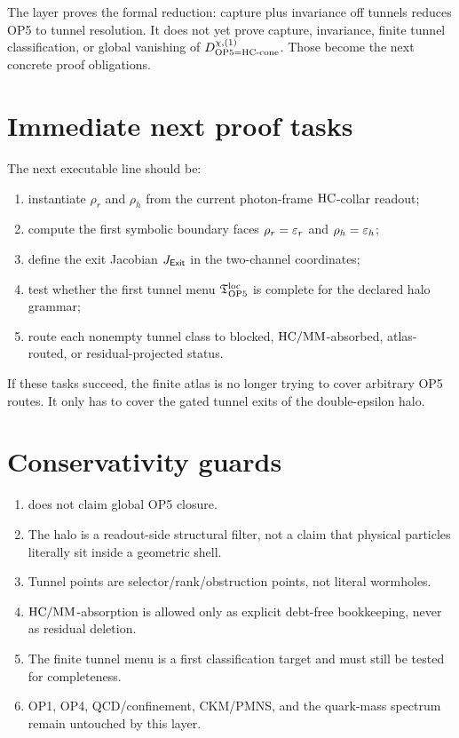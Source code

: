 \begin{remark}
The layer proves the formal reduction: capture plus invariance off tunnels reduces OP5 to tunnel resolution. It does not yet prove capture, invariance, finite tunnel classification, or global vanishing of \(D_{\mathrm{OP}5=\mathrm{HC}\text{-}\mathrm{cone}}^{\chi,(1)}\). Those become the next concrete proof obligations.
\end{remark}

\section{Immediate next proof tasks}

The next executable line should be:
\begin{enumerate}
 \item instantiate \(\rho_r\) and \(\rho_h\) from the current photon-frame \(\mathrm{HC}\)-collar readout;
 \item compute the first symbolic boundary faces \(\rho_r=\varepsilon_r\) and \(\rho_h=\varepsilon_h\);
 \item define the exit Jacobian \(J_{\mathsf{Exit}}\) in the two-channel coordinates;
 \item test whether the first tunnel menu \(\mathfrak T_{\mathrm{OP}5}^{\mathrm{loc}}\) is complete for the declared halo grammar;
 \item route each nonempty tunnel class to blocked, \(\mathrm{HC}/\mathrm{MM}\)-absorbed, atlas-routed, or residual-projected status.
\end{enumerate}
If these tasks succeed, the finite atlas is no longer trying to cover arbitrary OP5 routes. It only has to cover the gated tunnel exits of the double-epsilon halo.

\section{Conservativity guards}

\begin{enumerate}
 \item does not claim global OP5 closure.
 \item The halo is a readout-side structural filter, not a claim that physical particles literally sit inside a geometric shell.
 \item Tunnel points are selector/rank/obstruction points, not literal wormholes.
 \item \(\mathrm{HC}/\mathrm{MM}\)-absorption is allowed only as explicit debt-free bookkeeping, never as residual deletion.
 \item The finite tunnel menu is a first classification target and must still be tested for completeness.
 \item OP1, OP4, QCD/confinement, CKM/PMNS, and the quark-mass spectrum remain untouched by this layer.
\end{enumerate}


